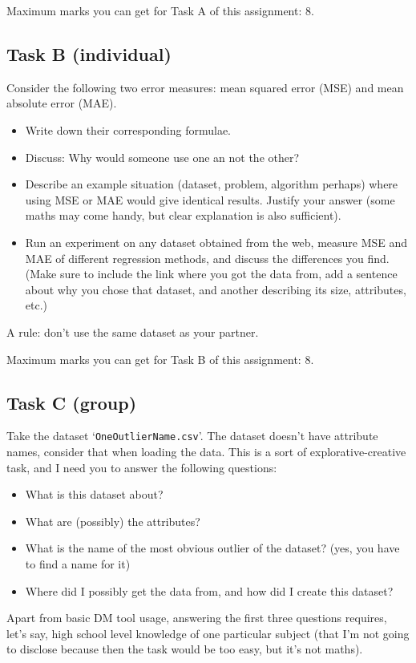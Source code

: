 \documentclass{llncs}
\begin{document}
Maximum marks you can get for Task A of this assignment: 8.

\subsection{Task B (individual)}
Consider the following two error measures: mean squared error (MSE) and mean absolute error (MAE).

\begin{itemize}
	\item Write down their corresponding formulae.
	\item Discuss: Why would someone use one an not the other?
	\item Describe an example situation (dataset, problem, algorithm perhaps) where using MSE or MAE would give identical results. Justify your answer (some maths may come handy, but clear explanation is also sufficient).
	\item Run an experiment on any dataset obtained from the web, measure MSE and MAE of different regression methods, and discuss the differences you find. (Make sure to include the link where you got the data from, add a sentence about why you chose that dataset, and another describing its size, attributes, etc.)
\end{itemize}

A rule: don't use the same dataset as your partner.

Maximum marks you can get for Task B of this assignment: 8.

\subsection{Task C (group)}
Take the dataset `\texttt{OneOutlierName.csv}'. The dataset doesn't have attribute names, consider that when loading the data. This is a sort of explorative-creative task, and I need you to answer the following questions:
\begin{itemize}
	\item What is this dataset about?
	\item What are (possibly) the attributes?
	\item What is the name of the most obvious outlier of the dataset? (yes, you have to find a name for it)
	\item Where did I possibly get the data from, and how did I create this dataset?
\end{itemize}
Apart from basic DM tool usage, answering the first three questions requires, let's say, high school level knowledge of one particular subject (that I'm not going to disclose because then the task would be too easy, but it's not maths).
\end{document}
